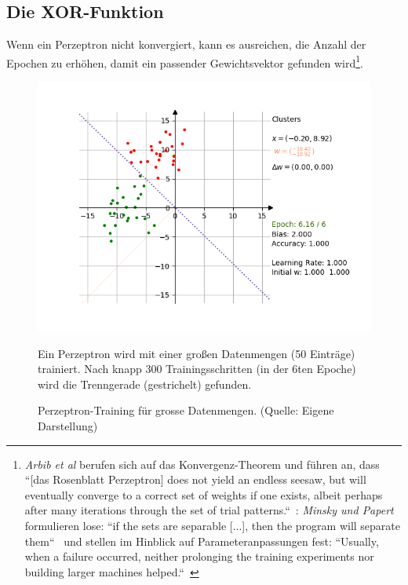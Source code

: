 \subsection{Die XOR-Funktion}

Wenn ein Perzeptron nicht konvergiert, kann es ausreichen, die Anzahl der Epochen zu erhöhen, damit ein passender Gewichtsvektor gefunden wird\footnote{
    \textit{Arbib et al} berufen sich auf das Konvergenz-Theorem und führen an, dass ``[das Rosenblatt Perzeptron] does not yield an endless seesaw, but will eventually converge to a correct set of weights if one exists, albeit perhaps after many iterations through the set of trial patterns.``~\cite[20]{Arb03}: \textit{Minsky und Papert} formulieren lose: ``if the sets are separable [...], then the program will separate them``~\cite[165]{MP88} und stellen im Hinblick auf Parameteranpassungen fest: ``Usually, when a failure occurred, neither prolonging the training experiments nor building larger machines helped.``~\cite[xi]{MP88}
}.

\begin{figure}[h]
    \begin{center}
    \includegraphics{chapters/3. Kuenstliche Neuronen/images/blob_success}
    \caption{Perzeptron-Training für grosse Datenmengen. (Quelle: Eigene Darstellung)}
    \label{fig-rp-blobs}
    \end{center}
    \small Ein Perzeptron wird mit einer großen Datenmengen (50 Einträge) trainiert. Nach knapp 300 Trainingsschritten (in der 6ten Epoche) wird die Trenngerade (gestrichelt) gefunden.
\end{figure}

